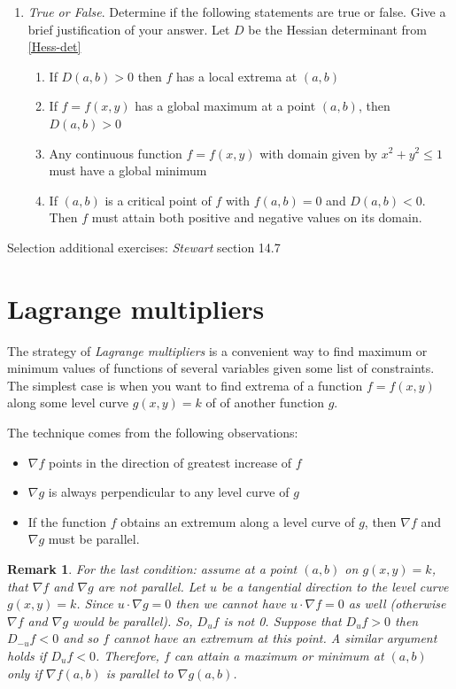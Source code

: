 \documentclass[12pt]{article}
\numberwithin{equation}{subsection}
\numberwithin{figure}{subsection}
\theoremstyle{note}
\newtheorem{remark}[subsection]{Remark}
\begin{document}
{\begin{enumerate}[label=\arabic*.]
\item \textit{True or False}. Determine if the following statements are true or false. Give a brief justification of your answer. Let $D$ be the Hessian determinant from \eqref{Hess-det}

\begin{enumerate}
	\item If $D(a,b)>0$ then $f$ has a local extrema at $(a,b)$
	\item If $f=f(x,y)$ has a global maximum at a point $(a,b)$, then $D(a,b)>0$
	\item Any continuous function $f=f(x,y)$ with domain given by $x^2+y^2\leq 1$ must have a global minimum
	\item If $(a,b)$ is a critical point of $f$ with $f(a,b)=0$ and $D(a,b)<0$. Then $f$ must attain both positive and negative values on its domain.

\end{enumerate}
\end{enumerate}

Selection additional exercises: \textit{Stewart} section 14.7

\section{Lagrange multipliers} \label{LM}

The strategy of \textit{Lagrange multipliers} is a convenient way to find maximum or minimum values of functions of several variables given some list of constraints. The simplest case is when you want to find extrema of a function $f=f(x,y)$ along some level curve $g(x,y)=k$ of of another function $g$.

The technique comes from the following observations: \begin{itemize} 
	\item $\nabla f$ points in the direction of greatest increase of $f$
	\item $\nabla g$ is always perpendicular to any level curve of $g$
	\item If the function $f$ obtains an extremum along a level curve of $g$, then $\nabla f$ and $\nabla g$ must be parallel. 
\end{itemize} 
\begin{remark}For the last condition: assume at a point $(a,b)$ on $g(x,y)=k$, that $\nabla f$ and $\nabla g$ are not parallel. Let $u$ be a tangential direction to the level curve $g(x,y)=k$. Since $u\cdot \nabla g=0$ then we cannot have $u\cdot \nabla f=0$ as well (otherwise $\nabla f$ and $\nabla g$ would be parallel). So, $D_u f$ is not 0. Suppose that $D_uf>0$ then $D_{-u}f<0$ and so $f$ cannot have an extremum at this point. A similar argument holds if $D_uf<0$. Therefore, $f$ can attain a maximum or minimum at $(a,b)$ only if $\nabla f(a,b)$ is parallel to $\nabla g(a,b)$.
\end{remark}

}
\end{document}

